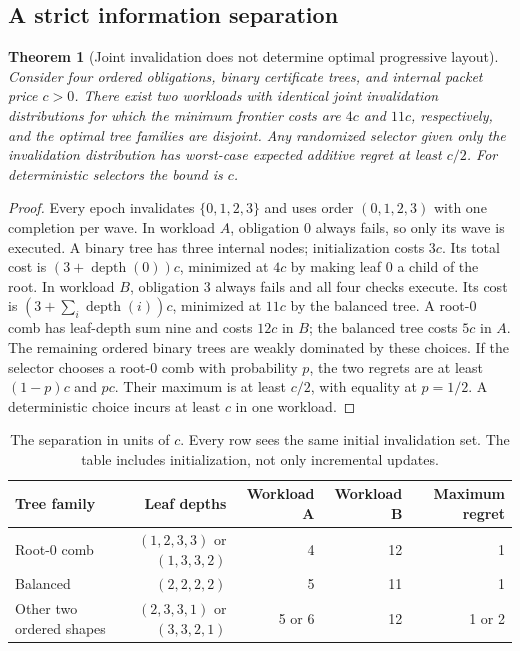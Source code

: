 \documentclass[11pt]{article}
\newtheorem{theorem}{Theorem}\newtheorem{proposition}[theorem]{Proposition}\newtheorem{lemma}[theorem]{Lemma}
\theoremstyle{definition}\newtheorem{definition}[theorem]{Definition}
\theoremstyle{remark}\newtheorem{remark}[theorem]{Remark}
\begin{document}
\subsection{A strict information separation}
\begin{theorem}[Joint invalidation does not determine optimal progressive layout]\label{thm:separation}
Consider four ordered obligations, binary certificate trees, and internal packet price $c>0$. There exist two workloads with identical joint invalidation distributions for which the minimum frontier costs are $4c$ and $11c$, respectively, and the optimal tree families are disjoint. Any randomized selector given only the invalidation distribution has worst-case expected additive regret at least $c/2$. For deterministic selectors the bound is $c$.
\end{theorem}
\begin{proof}
Every epoch invalidates $\{0,1,2,3\}$ and uses order $(0,1,2,3)$ with one completion per wave. In workload $A$, obligation 0 always fails, so only its wave is executed. A binary tree has three internal nodes; initialization costs $3c$. Its total cost is $(3+\operatorname{depth}(0))c$, minimized at $4c$ by making leaf 0 a child of the root. In workload $B$, obligation 3 always fails and all four checks execute. Its cost is $(3+\sum_i\operatorname{depth}(i))c$, minimized at $11c$ by the balanced tree. A root-0 comb has leaf-depth sum nine and costs $12c$ in $B$; the balanced tree costs $5c$ in $A$. The remaining ordered binary trees are weakly dominated by these choices. If the selector chooses a root-0 comb with probability $p$, the two regrets are at least $(1-p)c$ and $pc$. Their maximum is at least $c/2$, with equality at $p=1/2$. A deterministic choice incurs at least $c$ in one workload.\end{proof}

\begin{table}[t]
\centering\small
\caption{The separation in units of $c$. Every row sees the same initial invalidation set. The table includes initialization, not only incremental updates.}
\begin{tabular}{@{}lrrrr@{}}
\toprule
Tree family & Leaf depths & Workload A & Workload B & Maximum regret\\
\midrule
Root-0 comb & $(1,2,3,3)$ or $(1,3,3,2)$ & 4 & 12 & 1\\
Balanced & $(2,2,2,2)$ & 5 & 11 & 1\\
Other two ordered shapes & $(2,3,3,1)$ or $(3,3,2,1)$ & 5 or 6 & 12 & 1 or 2\\
\bottomrule
\end{tabular}
\end{table}
\end{document}
